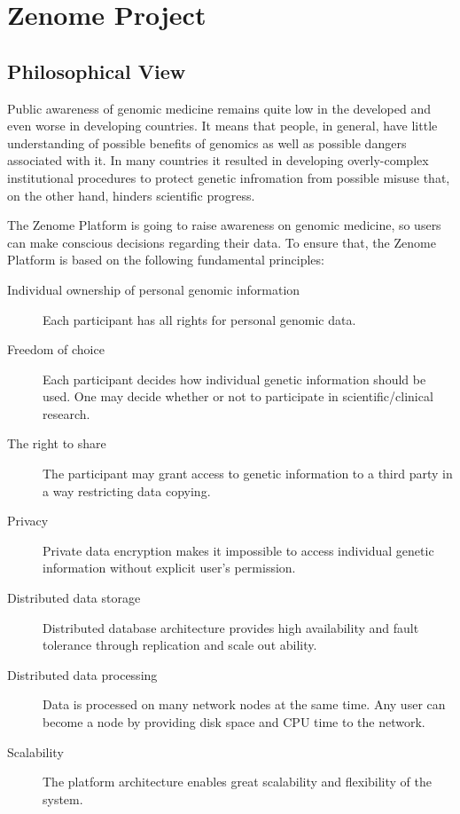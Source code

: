 \section{Zenome Project}

\subsection{Philosophical View} %
Public awareness of genomic medicine remains quite low in the developed and even worse in developing countries. It means that people, in general, have little understanding of possible benefits of genomics as well as possible dangers associated with it. In many countries it resulted in developing overly-complex institutional procedures to protect genetic infromation from possible misuse that, on the other hand, hinders scientific progress.

The Zenome Platform is going to raise awareness on genomic medicine, so users can make conscious decisions regarding their data. To ensure that, the Zenome Platform is based on the following fundamental principles:

\begin{description}
  \item [Individual ownership of personal genomic information]
    Each participant has all rights for personal genomic data.
  \item [Freedom of choice]
    Each participant decides how individual genetic information should be used. One may decide whether or not to participate in scientific/clinical research.
  \item [The right to share]
    The participant may grant access to genetic information to a third party in a way restricting data copying.
  \item [Privacy]
    Private data encryption makes it impossible to access individual genetic information without explicit user's permission.
  \item [Distributed data storage]
    Distributed database architecture provides high availability and fault tolerance through replication and scale out ability.
  \item [Distributed data processing]
    Data is processed on many network nodes at the same time. Any user can become a node by providing disk space and CPU time to the network.
  \item [Scalability]
    The platform architecture enables great scalability and flexibility of the system.
\end{description}


